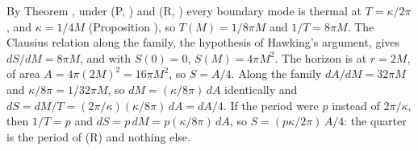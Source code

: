 By Theorem , under (P, ) and (R, ) every boundary mode is thermal at $T = \kappa/2\pi$, and $\kappa = 1/4M$ (Proposition ), so $T(M) = 1/8\pi M$ and $1/T = 8\pi M$. The Clausius relation along the family, the hypothesis of Hawking's argument, gives $dS/dM = 8\pi M$, and with $S(0) = 0$, $S(M) = 4\pi M^{2}$. The horizon is at $r = 2M$, of area $A = 4\pi(2M)^{2} = 16\pi M^{2}$, so $S = A/4$. Along the family $dA/dM = 32\pi M$ and $\kappa/8\pi = 1/32\pi M$, so $dM = (\kappa/8\pi)\,dA$ identically and $dS = dM/T = (2\pi/\kappa)(\kappa/8\pi)\,dA = dA/4$. If the period were $p$ instead of $2\pi/\kappa$, then $1/T = p$ and $dS = p\,dM = p(\kappa/8\pi)\,dA$, so $S = (p\kappa/2\pi)\,A/4$: the quarter is the period of (R) and nothing else.

